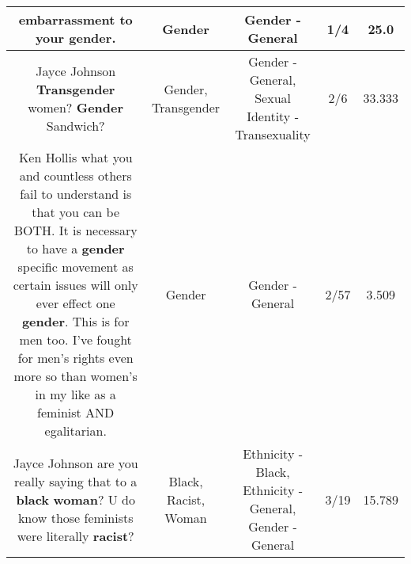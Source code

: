 \documentclass[11pt]{article}
\newlength\mylength
\begin{document}
\begin{center}
\begin{longtable}{|C{.65\mylength}|C{.30\mylength}|C{.12\mylength}|C{.12\mylength}|C{.12\mylength}|}
  \small embarrassment to your \textbf{gender}.\normalsize   & Gender & Gender - General & 1/4 & 25.0 \\  \hline
  \small Jayce Johnson \textbf{Transgender} women? \textbf{Gender} Sandwich?\normalsize   & Gender, Transgender & Gender - General, Sexual Identity - Transexuality & 2/6 & 33.333 \\  \hline
  \small Ken Hollis what you and countless others fail to understand is that you can be BOTH. It is necessary to have a \textbf{gender} specific movement as certain issues will only ever effect one \textbf{gender}. This is for men too. I've fought for men's rights even more so than women's in my like as a feminist AND egalitarian.\normalsize   & Gender & Gender - General & 2/57 & 3.509 \\  \hline
  \small Jayce Johnson are you really saying that to a \textbf{black} \textbf{woman}? U do know those feminists were literally \textbf{racist}?\normalsize   & Black, Racist, Woman & Ethnicity - Black, Ethnicity - General, Gender - General & 3/19 & 15.789 \\  \hline

\end{longtable}
\end{center}
\end{document}
